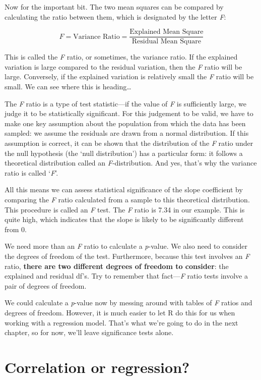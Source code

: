 \documentclass[
]{book}
\begin{document}
Now for the important bit. The two mean squares can be compared by calculating the ratio between them, which is designated by the letter \emph{F}:

\[F = \mbox{Variance Ratio} = \frac{\mbox{Explained Mean Square}}{\mbox{Residual Mean Square}}\]

This is called the \emph{F} ratio, or sometimes, the variance ratio. If the explained variation is large compared to the residual variation, then the \emph{F} ratio will be large. Conversely, if the explained variation is relatively small the \emph{F} ratio will be small. We can see where this is heading\ldots{}

The \emph{F} ratio is a type of test statistic---if the value of \emph{F} is sufficiently large, we judge it to be statistically significant. For this judgement to be valid, we have to make one key assumption about the population from which the data has been sampled: we assume the residuals are drawn from a normal distribution. If this assumption is correct, it can be shown that the distribution of the \emph{F} ratio under the null hypothesis (the `null distribution') has a particular form: it follows a theoretical distribution called an \emph{F}-distribution. And yes, that's why the variance ratio is called `\emph{F}'.

All this means we can assess statistical significance of the slope coefficient by comparing the \emph{F} ratio calculated from a sample to this theoretical distribution. This procedure is called an \emph{F} test. The \emph{F} ratio is 7.34 in our example. This is quite high, which indicates that the slope is likely to be significantly different from 0.

We need more than an \emph{F} ratio to calculate a \emph{p}-value. We also need to consider the degrees of freedom of the test. Furthermore, because this test involves an \emph{F} ratio, \textbf{there are two different degrees of freedom to consider}: the explained and residual df's. Try to remember that fact---\emph{F} ratio tests involve a pair of degrees of freedom.

We could calculate a \emph{p}-value now by messing around with tables of \emph{F} ratios and degrees of freedom. However, it is much easier to let R do this for us when working with a regression model. That's what we're going to do in the next chapter, so for now, we'll leave significance tests alone.

\hypertarget{correlation-or-regression}{%
\section{Correlation or regression?}\label{correlation-or-regression}}
\end{document}
